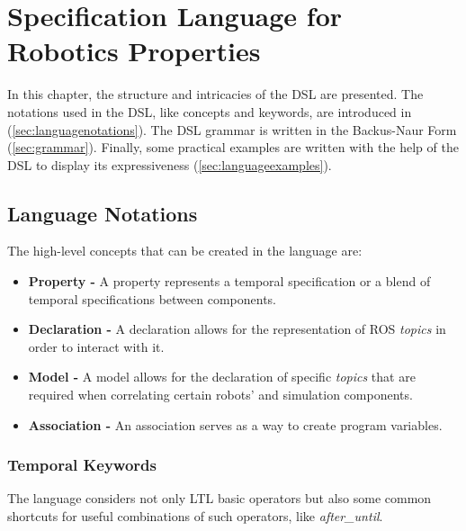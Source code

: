 \chapter{Specification Language for Robotics Properties}
\label{chap:language}

In this chapter, the structure and intricacies of the DSL are presented. The notations used in the DSL, like concepts and keywords, are introduced in (\autoref{sec:languagenotations}). The DSL grammar is written in the Backus-Naur Form (\autoref{sec:grammar}). Finally, some practical examples are written with the help of the DSL to display its expressiveness (\autoref{sec:languageexamples}).


\section{Language Notations}
\label{sec:languagenotations}

The high-level concepts that can be created in the language are:

\begin{itemize}
\item \textbf{Property -} A property represents a temporal specification or a blend of temporal specifications between components.
\item \textbf{Declaration -} A declaration allows for the representation of ROS \textit{topics} in order to interact with it.
\item \textbf{Model -} A model allows for the declaration of specific \textit{topics} that are required when correlating certain robots' and simulation components.
\item \textbf{Association -} An association serves as a way to create program variables.
\end{itemize}


\subsection{Temporal Keywords}
\label{ssec:tempkeywords}

The language considers not only LTL basic operators but also some common shortcuts for useful combinations of such operators, like \textit{after\_until}.

